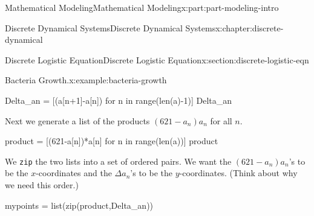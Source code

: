 \documentclass[oneside,10pt,]{book}
\newcommand{\mono}[1]{\texttt{#1}}
\numberwithin{equation}{section}
\begin{document}
\begin{partptx}{Mathematical Modeling}{}{Mathematical Modeling}{}{}{x:part:part-modeling-intro}
\begin{chapterptx}{Discrete Dynamical Systems}{}{Discrete Dynamical Systems}{}{}{x:chapter:discrete-dynamical}
\begin{sectionptx}{Discrete Logistic Equation}{}{Discrete Logistic Equation}{}{}{x:section:discrete-logistic-eqn}
\begin{example}{Bacteria Growth.}{x:example:bacteria-growth}
\begin{sageinput}
Delta_an = [(a[n+1]-a[n]) for n in range(len(a)-1)]
Delta_an
\end{sageinput}
\begin{sageoutput}
[6.90000000000000,
 9.80000000000000,
 18.3000000000000,
 34.9000000000000,
 45.1000000000000,
 50.9000000000000,
 79.4000000000000,
 75.2000000000000,
 59.6000000000000,
 49.6000000000000,
 80.4000000000000,
 40.0000000000000,
 40.1000000000000,
 10.3000000000000,
 3.80000000000007,
 3.69999999999993,
 1.20000000000005,
 0.500000000000000,
 1]
\end{sageoutput}
Next we generate a list of the products \((621-a_n)a_n\) for all \(n\).%
\begin{sageinput}
product = [(621-a[n])*a[n] for n in range(len(a))]
product
\end{sageinput}
\begin{sageoutput}
[6290.21000000000,
 10385.3600000000,
 16038,
 26079.2100000000,
 43372.1600000000,
 62111.2100000000,
 78373.7600000000,
 93396.2400000000,
 95998.1600000000,
 90026.2400000000,
 79640,
 52352.2400000000,
 33960.2400000000,
 12310.2500000000,
 6230.16000000003,
 3933.43999999999,
 1669.41000000003,
 929.250000000000,
 620,
 0]
\end{sageoutput}
We \mono{zip} the two lists into a set of ordered pairs.  We want the \((621-a_n)a_n\)'s to be the \(x\)-coordinates and the \(\Delta a_n\)'s to be the \(y\)-coordinates. (Think about why we need this order.)%
\begin{sageinput}
mypoints = list(zip(product,Delta_an))


\end{sageinput}
\end{example}
\end{sectionptx}
\end{chapterptx}
\end{partptx}
\end{document}
